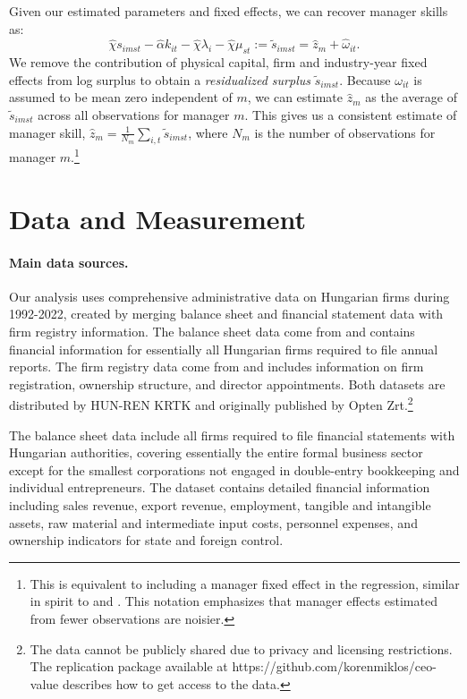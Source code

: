 \documentclass[11pt,a4paper]{article}
\begin{document}
Given our estimated parameters and fixed effects, we can recover manager skills as:
\begin{equation}\label{eq:estimated}
\hat\chi s_{imst} -  \hat\alpha k_{it}  -\hat\chi \lambda_i -\hat\chi \mu_{st} := \tilde s_{imst} = \hat z_m + \hat\omega_{it}. 
\end{equation}
We remove the contribution of physical capital, firm and industry-year fixed effects from log surplus to obtain a \emph{residualized surplus} $\tilde s_{imst}$. Because $\omega_{it}$ is assumed to be mean zero independent of $m$, we can estimate $\hat z_m$ as the average of $\tilde s_{imst}$ across all observations for manager $m$. This gives us a consistent estimate of manager skill, $\hat z_m = \frac1{N_m}\sum_{i,t} \tilde s_{imst}$, where $N_m$ is the number of observations for manager $m$.\footnote{This is equivalent to including a manager fixed effect in the regression, similar in spirit to \citet{Abowd1999Econometrica} and \citet{Card2018JoLE}. This notation emphasizes that manager effects estimated from fewer observations are noisier.}

\section{Data and Measurement}
\paragraph{Main data sources.} Our analysis uses comprehensive administrative data on Hungarian firms during 1992-2022, created by merging balance sheet and financial statement data with firm registry information. The balance sheet data come from \citet{merleg2024} and contains financial information for essentially all Hungarian firms required to file annual reports. The firm registry data come from \citet{cegjegyzek2024} and includes information on firm registration, ownership structure, and director appointments. Both datasets are distributed by HUN-REN KRTK and originally published by Opten Zrt.\footnote{The data cannot be publicly shared due to privacy and licensing restrictions. The replication package available at https://github.com/korenmiklos/ceo-value describes how to get access to the data.}

The balance sheet data include all firms required to file financial statements with Hungarian authorities, covering essentially the entire formal business sector except for the smallest corporations not engaged in double-entry bookkeeping and individual entrepreneurs. The dataset contains detailed financial information including sales revenue, export revenue, employment, tangible and intangible assets, raw material and intermediate input costs, personnel expenses, and ownership indicators for state and foreign control.
\end{document}
